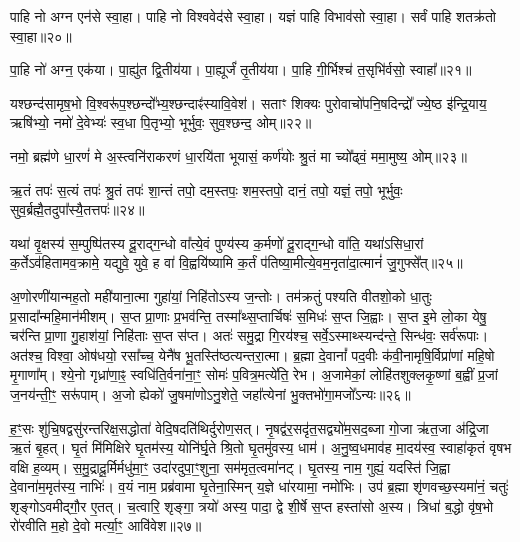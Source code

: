 पाहि नो अग्न एन॑से स्वा॒हा। 
पाहि नो विश्ववेद॑से स्वा॒हा। 
यज्ञं पाहि विभाव॑सो स्वा॒हा। 
सर्वं पाहि शतक्र॑तो स्वा॒हा॥२०॥
\anuvakamend

पा॒हि नो॑ अग्न॒ एक॑या। 
पा॒ह्यु॑त द्वि॒तीय॑या। 
पा॒ह्यूर्जं॑ तृ॒तीय॑या। 
पा॒हि गी॒र्भिश्च॑ त॒सृभि॑र्वसो॒ स्वाहा᳚॥२१॥
\anuvakamend

यश्छन्द॑सामृष॒भो वि॒श्वरू॑प॒श्छन्दो᳚भ्य॒श्छन्दाꣴ॑स्यावि॒वेश॑। 
सताꣳ शिक्यः पुरोवाचो॑पनि॒षदिन्द्रो᳚ ज्ये॒ष्ठ इ॑न्द्रि॒याय॒ ऋषि॑भ्यो॒ नमो॑ दे॒वेभ्यः॑ स्व॒धा पि॒तृभ्यो॒ भूर्भुवः॒ सुव॒श्छन्द॒ ओम्॥२२॥
\anuvakamend


नमो॒ ब्रह्म॑णे धा॒रणं॑ मे अ॒स्त्वनि॑राकरणं धा॒रयि॑ता भूयासं॒ कर्ण॑योः श्रु॒तं मा च्यो᳚ढ्वं॒ ममा॒मुष्य॒ ओम्॥२३॥
\anuvakamend

ऋ॒तं तपः॑ स॒त्यं तपः॑ श्रु॒तं तपः॑ शा॒न्तं तपो॒ दम॒स्तपः॒ शम॒स्तपो॒ दानं॒ तपो॒ यज्ञं॒ तपो॒ भूर्भुवः॒ सुव॒र्ब्रह्मै॒तदुपा᳚स्यै॒तत्तपः॑॥२४॥
\anuvakamend


यथा॑ वृ॒क्षस्य॑ स॒म्पुष्पि॑तस्य दू॒राद्ग॒न्धो वा᳚त्ये॒वं पुण्य॑स्य क॒र्मणो॑ दू॒राद्ग॒न्धो वा॑ति॒ यथा॑ऽसिधा॒रां क॒र्तेऽव॑हितामव॒क्रामे॒ यद्युवे॒ युवे॒ ह वा॑ वि॒ह्वयि॑ष्यामि क॒र्तं प॑तिष्या॒मीत्ये॒वम॒नृता॑दा॒त्मानं॑ जु॒गुफ्से᳚त्॥२५॥
\anuvakamend


अ॒णोरणी॑यान्मह॒तो मही॑याना॒त्मा गुहा॑यां॒ निहि॑तोऽस्य ज॒न्तोः। 
तम॑क्रतुं पश्यति वीतशो॒को धा॒तुः प्र॒सादा᳚न्महि॒मान॑\-मीशम्। 
स॒प्त प्रा॒णाः प्र॒भव॑न्ति॒ तस्मा᳚थ्स॒प्तार्चिषः॑ स॒मिधः॑ स॒प्त जि॒ह्वाः। 
स॒प्त इ॒मे लो॒का येषु॒ चर॑न्ति प्रा॒णा गु॒हाश॑यां॒ निहि॑ताः स॒प्त स॑प्त। 
अतः॑ समु॒द्रा गि॒रय॑श्च॒ सर्वे॒ऽस्माथ्स्यन्द॑न्ते॒ सिन्ध॑वः॒ सर्व॑रूपाः। 
अत॑श्च॒ विश्वा॒ ओष॑धयो॒ रसा᳚च्च॒ येनै॑ष भू॒तस्ति॑ष्ठत्यन्तरा॒त्मा। 
ब्र॒ह्मा दे॒वानां᳚ पद॒वीः क॑वी॒नामृषि॒र्विप्रा॑णां महि॒षो मृ॒गाणा᳚म्। 
श्ये॒नो गृध्रा॑णा॒ꣴ॒ स्वधि॑ति॒र्वना॑ना॒ꣳ॒ सोमः॑ प॒वित्र॒मत्ये॑ति॒ रेभ\sn{}। 
अ॒जामेकां॒ लोहि॑तशुक्लकृ॒ष्णां ब॒ह्वीं प्र॒जां ज॒नय॑न्ती॒ꣳ॒ सरू॑पाम्। 
अ॒जो ह्येको॑ जु॒षमा॑णोऽनु॒शेते॒ जहा᳚त्येनां भु॒क्तभो॑गा॒मजो᳚ऽन्यः॥२६॥

ह॒ꣳ॒सः शु॑चि॒षद्वसु॑रन्तरिक्ष॒सद्धोता॑ वेदि॒षदति॑थिर्दुरोण॒सत्। 
नृ॒षद्व॑र॒सदृ॑त॒सद्व्यो॑म॒सद॒ब्जा गो॒जा ऋ॑त॒जा अ॑द्रि॒जा ऋ॒तं बृ॒हत्। 
घृ॒तं मि॑मिक्षिरे घृ॒तम॑स्य॒ योनि॑र्घृ॒ते श्रि॒तो घृ॒तमु॑वस्य॒ धाम॑। 
अ॒नु॒ष्व॒धमाव॑ह मा॒दय॑स्व॒ स्वाहा॑कृतं वृषभ वक्षि ह॒व्यम्। 
स॒मु॒द्रादू॒र्मिर्मधु॑मा॒ꣳ॒ उदा॑रदुपा॒ꣳ॒शुना॒ सम॑मृत॒त्वमा॑नट्। 
घृ॒तस्य॒ नाम॒ गुह्यं॒ यदस्ति॑ जि॒ह्वा दे॒वाना॑म॒मृत॑स्य॒ नाभिः॑। 
व॒यं नाम॒ प्रब्र॑वामा घृ॒तेना॒स्मिन् य॒ज्ञे धा॑रयामा॒ नमो॑भिः। 
उप॑ ब्र॒ह्मा शृ॑णवच्छ॒स्यमा॑नं॒ चतुः॑ शृङ्गोऽवमीद्गौ॒र ए॒तत्। 
च॒त्वारि॒ शृङ्गा॒ त्रयो॑ अस्य॒ पादा॒ द्वे शी॒र्\mbox{}षे स॒प्त हस्ता॑सो अ॒स्य। 
त्रिधा॑ ब॒द्धो वृ॑ष॒भो रो॑रवीति म॒हो दे॒वो मर्त्या॒ꣳ॒ आवि॑वेश॥२७॥

